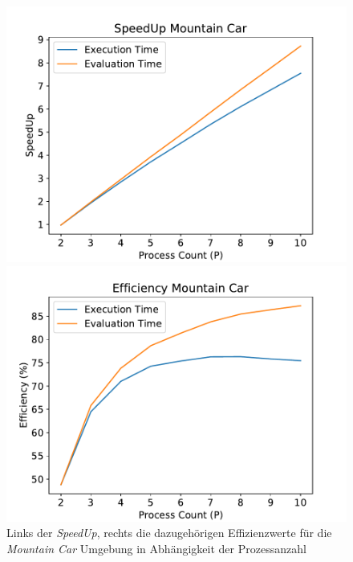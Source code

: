 \begin{figure}[!h]
	\centering
	\begin{minipage}[]{0.49\textwidth}
		\includegraphics[width=1.0\textwidth]{./img/mountain_car_analysis/mountain_car_speedup_2_10.pdf} 
	\end{minipage}
	\hfill
	\begin{minipage}[]{0.49\textwidth}
		\includegraphics[width=1.0\textwidth]{./img/mountain_car_analysis/efficecny mountain_car_2_10.pdf} 
	\end{minipage}
	\caption{Links der \emph{SpeedUp}, rechts die dazugehörigen Effizienzwerte für die \emph{Mountain Car} Umgebung in Abhängigkeit der Prozessanzahl}
	\label{fig:mountain_car_2_10_efficiency_speedup}
\end{figure}

